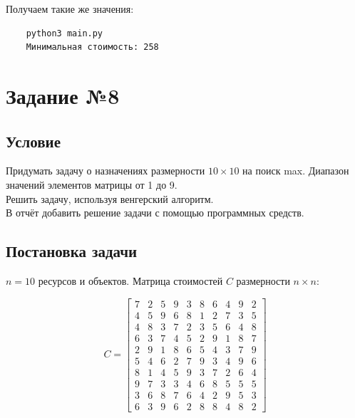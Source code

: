 \documentclass{article}
\begin{document}
Получаем такие же значения:
\begin{verbatim}
    python3 main.py
    Минимальная стоимость: 258
\end{verbatim}

\newpage
\section{Задание №8}

\subsection{Условие}

Придумать задачу о назначениях размерности $10 \times 10$ на поиск max. Диапазон значений элементов матрицы от 1 до 9.\\
Решить задачу, используя венгерский алгоритм.\\
В отчёт добавить решение задачи с помощью программных средств.

\subsection{Постановка задачи}

$n = 10$ ресурсов и объектов. Матрица стоимостей $C$ размерности $n \times n$:

\[
    C = \begin{bmatrix}
        7 & 2 & 5 & 9 & 3 & 8 & 6 & 4 & 9 & 2 \\
        4 & 5 & 9 & 6 & 8 & 1 & 2 & 7 & 3 & 5 \\
        4 & 8 & 3 & 7 & 2 & 3 & 5 & 6 & 4 & 8 \\
        6 & 3 & 7 & 4 & 5 & 2 & 9 & 1 & 8 & 7 \\
        2 & 9 & 1 & 8 & 6 & 5 & 4 & 3 & 7 & 9 \\
        5 & 4 & 6 & 2 & 7 & 9 & 3 & 4 & 9 & 6 \\
        8 & 1 & 4 & 5 & 9 & 3 & 7 & 2 & 6 & 4 \\
        9 & 7 & 3 & 3 & 4 & 6 & 8 & 5 & 5 & 5 \\
        3 & 6 & 8 & 7 & 6 & 4 & 2 & 9 & 5 & 3 \\
        6 & 3 & 9 & 6 & 2 & 8 & 8 & 4 & 8 & 2
    \end{bmatrix}
\]
\end{document}
